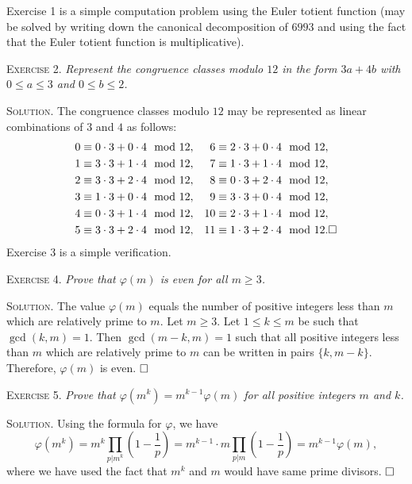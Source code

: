 \documentclass[11pt, leqno]{article}
\newcommand{\done}{\ensuremath{\hfill\square}}
\begin{document}
Exercise 1 is a simple computation problem using the Euler totient function (may be solved by writing down the canonical decomposition of $6993$ and using the fact that the Euler totient function is multiplicative).

\textsc{Exercise 2}. \emph{Represent the congruence classes modulo $12$ in the form $3a+4b$ with $0\leq a \leq 3$ and $0\leq b \leq 2$.}

\textsc{Solution}. The congruence classes modulo $12$ may be represented as linear combinations of $3$ and $4$ as follows: 
\begin{align*}
  0 & \equiv 0\cdot 3 + 0\cdot 4 \mod 12, & 6 & \equiv 2\cdot 3 + 0\cdot 4 \mod 12,\\
  1 & \equiv 3\cdot 3 + 1\cdot 4 \mod 12, & 7 & \equiv 1\cdot 3 + 1\cdot 4 \mod 12,\\
  2 & \equiv 3\cdot 3 + 2\cdot 4 \mod 12, & 8 & \equiv 0\cdot 3 + 2\cdot 4 \mod 12,\\
  3 & \equiv 1\cdot 3 + 0\cdot 4 \mod 12, & 9 & \equiv 3\cdot 3 + 0\cdot 4 \mod 12,\\
  4 & \equiv 0\cdot 3 + 1\cdot 4 \mod 12, & 10 & \equiv 2\cdot 3 + 1\cdot 4 \mod 12,\\
  5 & \equiv 3\cdot 3 + 2\cdot 4 \mod 12, & 11 & \equiv 1\cdot 3 + 2\cdot 4 \mod 12. \done
\end{align*}
Exercise 3 is a simple verification.

\textsc{Exercise 4}. \emph{Prove that $\varphi(m)$ is even for all $m\geq 3$.}

\textsc{Solution}. The value $\varphi(m)$ equals the number of positive integers less than $m$ which are relatively prime to $m$. Let $m\geq 3$. Let $1\leq k \leq m$ be such that $\gcd(k, m) = 1$. Then $\gcd(m-k, m) = 1$ such that all positive integers less than $m$ which are relatively prime to $m$ can be written in pairs $\{k, m-k\}$. Therefore, $\varphi(m)$ is even. \done

\textsc{Exercise 5}. \emph{Prove that $\varphi(m^k) = m^{k-1}\varphi(m)$ for all positive integers $m$ and $k$.}

\textsc{Solution}. Using the formula for $\varphi$, we have
\begin{displaymath}
\varphi(m^k) = m^k \prod_{p|m^k} \left(1-\frac{1}{p}\right) = m^{k-1}\cdot m \prod_{p|m}\left(1-\frac{1}{p}\right) = m^{k-1}\varphi(m),
\end{displaymath}
where we have used the fact that $m^k$ and $m$ would have same prime divisors. \done
\end{document}
